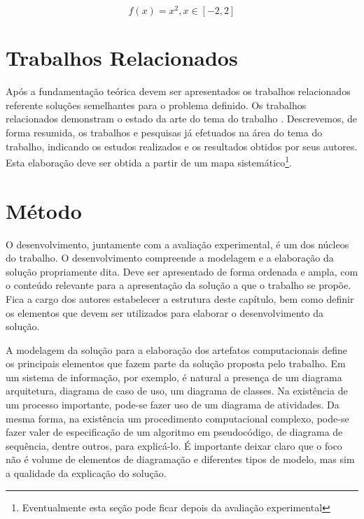 \documentclass[12pt]{tcc}
\begin{document}
\begin{equation}
	\label{eq:exemplo}
	f(x) = x^2, x \in [-2,2]
\end{equation}

\chapter{Trabalhos Relacionados}
\label{sec:trabalhos_relacionados}
	\label{sec:trab_relacionados}

Após a fundamentação teórica devem ser apresentados os trabalhos relacionados referente soluções semelhantes para o problema definido. Os trabalhos relacionados demonstram o estado da arte do tema do trabalho \citep{wazlawick_metodologia_2017}. Descrevemos, de forma resumida, os trabalhos e pesquisas já efetuados na área do tema do trabalho, indicando os estudos realizados e os resultados obtidos por seus autores. Esta elaboração deve ser obtida a partir de um mapa sistemático\footnote{Eventualmente esta seção pode ficar depois da avaliação experimental}. 

\chapter{Método} 
	\label{sec:metodologia}

O desenvolvimento, juntamente com a avaliação experimental, é um dos núcleos do trabalho. O desenvolvimento compreende a modelagem e a elaboração da solução propriamente dita. Deve ser apresentado de forma ordenada e ampla, com o conteúdo relevante para a apresentação da solução a que o trabalho se propõe. Fica a cargo dos autores estabelecer a estrutura deste capítulo, bem como definir os elementos que devem ser utilizados para elaborar o desenvolvimento da solução. 

A modelagem da solução para a elaboração dos artefatos computacionais define os principais elementos que fazem parte da solução proposta pelo trabalho. Em um sistema de informação, por exemplo, é natural a presença de um diagrama arquitetura, diagrama de caso de uso, um diagrama de classes. Na existência de um processo importante, pode-se fazer uso de um diagrama de atividades. Da mesma forma, na existência um procedimento computacional complexo, pode-se fazer valer de especificação de um algoritmo em pseudocódigo, de diagrama de sequência, dentre outros, para explicá-lo. É importante deixar claro que o foco não é volume de elementos de diagramação e diferentes tipos de modelo, mas sim a qualidade da explicação do solução.
\end{document}
